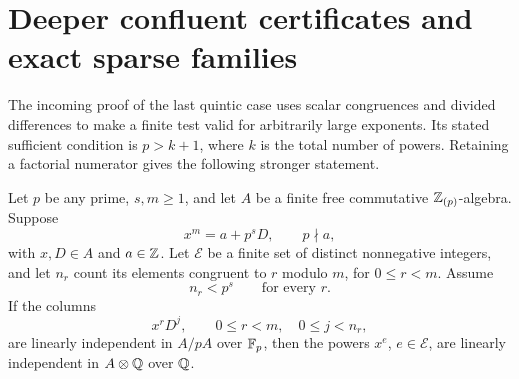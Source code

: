 \section{Deeper confluent certificates and exact sparse families}\label{sec:confluent}

The incoming proof of the last quintic case uses scalar congruences and divided differences to make a finite test valid for arbitrarily large exponents. Its stated sufficient condition is $p>k+1$, where $k$ is the total number of powers. Retaining a factorial numerator gives the following stronger statement.

\begin{theorem}\label{thm:confluent}
Let $p$ be any prime, $s,m\ge1$, and let $A$ be a finite free commutative $\mathbb Z_{(p)}$-algebra. Suppose
\[
                    x^m=a+p^sD,\qquad p\nmid a,
\]
with $x,D\in A$ and $a\in\mathbb Z$. Let $\mathcal E$ be a finite set of distinct nonnegative integers, and let $n_r$ count its elements congruent to $r$ modulo $m$, for $0\le r<m$. Assume
\begin{equation}\label{eq:block-bound}
                     n_r<p^s\qquad\text{for every }r.
\end{equation}
If the columns
\[
                x^rD^j,\qquad 0\le r<m,\quad0\le j<n_r,
\]
are linearly independent in $A/pA$ over $\mathbb F_p$, then the powers $x^e$, $e\in\mathcal E$, are linearly independent in $A\otimes\mathbb Q$ over $\mathbb Q$.
\end{theorem}

